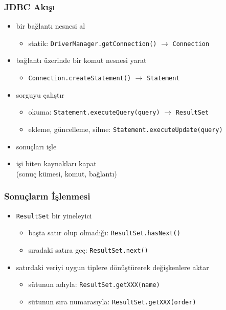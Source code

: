 \documentclass[dvipsnames]{beamer}
\theoremstyle{definition}
\theoremstyle{example}
\theoremstyle{plain}
\begin{document}
\begin{frame}
  \frametitle{JDBC Akışı}

  \begin{itemize}
    \item bir bağlantı nesnesi al
    \begin{itemize}
      \item statik: \lstinline!DriverManager.getConnection()!
	$\rightarrow$ \lstinline!Connection!
    \end{itemize}

    \pause
    \item bağlantı üzerinde bir komut nesnesi yarat
    \begin{itemize}
      \item \lstinline!Connection.createStatement()!
	 $\rightarrow$ \lstinline!Statement!
    \end{itemize}

    \pause
    \item sorguyu çalıştır
    \begin{itemize}
      \item okuma: \lstinline!Statement.executeQuery(query)!
	$\rightarrow$ \lstinline!ResultSet!
      \item ekleme, güncelleme, silme: \lstinline!Statement.executeUpdate(query)!
    \end{itemize}

    \pause
    \item sonuçları işle

    \pause
    \item işi biten kaynakları kapat\\
      (sonuç kümesi, komut, bağlantı)
  \end{itemize}
\end{frame}

\begin{frame}
  \frametitle{Sonuçların İşlenmesi}

  \begin{itemize}
    \item \lstinline!ResultSet! bir yineleyici
    \begin{itemize}
      \item başta satır olup olmadığı: \lstinline!ResultSet.hasNext()!
      \item sıradaki satıra geç: \lstinline!ResultSet.next()!
    \end{itemize}

    \pause
    \medskip
    \item satırdaki veriyi uygun tiplere dönüştürerek değişkenlere aktar
    \begin{itemize}
      \item sütunun adıyla: \lstinline!ResultSet.getXXX(name)!
      \item sütunun sıra numarasıyla: \lstinline!ResultSet.getXXX(order)!
    \end{itemize}
  \end{itemize}
\end{frame}
\end{document}
